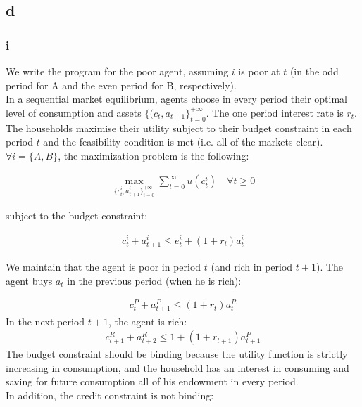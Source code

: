 \documentclass{article}
\begin{document}
\subsection{d}

\subsubsection{i}

We write the program for the poor agent, assuming $i$ is poor at $t$ (in the odd period for A and the even period for B, respectively). \\

In a sequential market equilibrium, agents choose in every period their optimal level of consumption and assets $\{(c_t, a_{t+1}\}^{+\infty}_{t=0}$. The one period interest rate is $r_t$. The households maximise their utility subject to their budget constraint in each period $t$ and the feasibility condition is met (i.e. all of the markets clear).\\

$\forall i=\{A,B\}$, the maximization problem is the following:

\begin{gather*}
    \max_{\{c_t^i, a_{t+1}^i\}^{+\infty}_{t=0}}\sum_{t=0}^{\infty}u(c_t^i)\quad\forall t \geq 0
\end{gather*}

subject to the budget constraint:

\begin{gather*}
    c_t^i+a^i_{t+1}\leq e_t^i+(1+r_t)a_t^i
\end{gather*}

We maintain that the agent is poor in period $t$ (and rich in period $t+1$). The agent buys $a_t$ in the previous period (when he is rich):

\begin{gather*}
    c_t^P+a^P_{t+1}\leq (1+r_t)a_t^R
\end{gather*}
In the next period $t+1$, the agent is rich:\\
\begin{gather*}
    c_{t+1}^R+a^R_{t+2}\leq 1+(1+r_{t+1})a_{t+1}^P
\end{gather*}
The budget constraint should be binding because the utility function is strictly increasing in consumption, and the household has an interest in consuming and saving for future consumption all of his endowment in every period.\\

In addition, the credit constraint is not binding:
\end{document}

